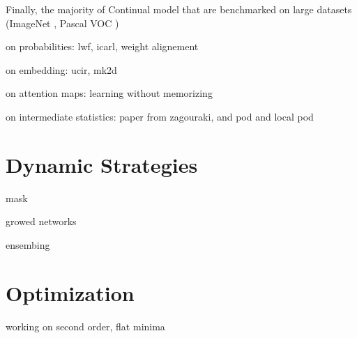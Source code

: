 Finally, the majority of Continual model that are benchmarked on large datasets (\eg ImageNet
\citep{deng2009imagenet}, Pascal VOC \citep{everingham2015pascalvoc})

on probabilities: lwf, icarl, weight alignement

on embedding: ucir, mk2d

on attention maps: learning without memorizing

on intermediate statistics: paper from zagouraki, and pod and local pod

\section{Dynamic Strategies}

mask

growed networks

ensembing


\section{Optimization}

working on second order, flat minima


